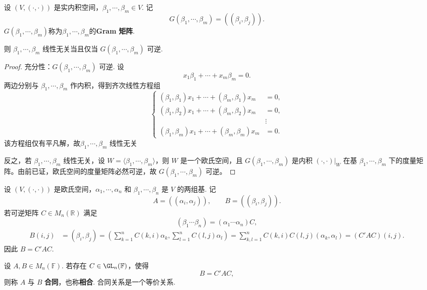 \begin{proposition}
	设 $(V,(\cdot,\cdot))$ 是实内积空间，$\beta_1,\cdots,\beta_m\in V$. 记
	\[
	G(\beta_1,\cdots,\beta_m)=((\beta_i,\beta_j)).
	\]
	\label{p1:concept:c6-l624}$G(\beta_1,\cdots,\beta_m)$称为$\beta_1,\cdots,\beta_m$的\textbf{Gram 矩阵}.
	
	则 $\beta_1,\cdots,\beta_m$ 线性无关当且仅当 $G(\beta_1,\cdots,\beta_m)$ 可逆.
\end{proposition}
\begin{proof}
	充分性：$G(\beta_1,\cdots,\beta_m)$ 可逆. 设
	\[
	x_1\beta_1+\cdots+x_m\beta_m=0.
	\]
	两边分别与 $\beta_1,\cdots,\beta_m$ 作内积，得到齐次线性方程组
	\[
	\left\{
	\begin{aligned}
		(\beta_1,\beta_1)x_1+\cdots+(\beta_m,\beta_1)x_m&=0,\\
		(\beta_1,\beta_2)x_1+\cdots+(\beta_m,\beta_2)x_m&=0,\\
		&\vdots\\
		(\beta_1,\beta_m)x_1+\cdots+(\beta_m,\beta_m)x_m&=0.
	\end{aligned}
	\right.
	\]
	该方程组仅有平凡解，故$\beta_1,\cdots,\beta_m$ 线性无关
	
	反之，若 $\beta_1,\cdots,\beta_m$ 线性无关，设 $W=\langle\beta_1,\cdots,\beta_m\rangle$，则 $W$ 是一个欧氏空间，且 $G(\beta_1,\cdots,\beta_m)$ 是内积 $(\cdot,\cdot)|_W$ 在基 $\beta_1,\cdots,\beta_m$ 下的度量矩阵。由前已证，欧氏空间的度量矩阵必然可逆，故 $G(\beta_1,\cdots,\beta_m)$ 可逆。
\end{proof}

\begin{example}
	设 $(V,(\cdot,\cdot))$ 是欧氏空间，$\alpha_1,\cdots,\alpha_n$ 和 $\beta_1,\cdots,\beta_n$ 是 $V$ 的两组基. 记
	\[
	A=((\alpha_i,\alpha_j)),
	\qquad
	B=((\beta_i,\beta_j)).
	\]
	若可逆矩阵 $C\in M_n(\mathbb{R})$ 满足
	\[
	(\beta_1\cdots\beta_n)=(\alpha_1\cdots\alpha_n)C,
	\]
	\[
	\begin{aligned}
		B(i,j)&=(\beta_i,\beta_j) =\left(\sum_{k=1}^n C(k,i)\alpha_k,\sum_{l=1}^n C(l,j)\alpha_l\right)=\sum_{k,l=1}^n C(k,i)C(l,j)(\alpha_k,\alpha_l)=(C'AC)(i,j).
	\end{aligned}
	\]
	因此 $B=C'AC$.
\end{example}


\begin{definition}\label{p1:concept:c6-l669}
	设 $A,B\in M_n(\mathbb{F})$. 若存在 $C\in \GL_n(\mathbb{F})$，使得
	\[
	B=C'AC,
	\]
	则称 $A$ 与 $B$ \textbf{合同}，也称\textbf{相合}. 合同关系是一个等价关系.
\end{definition}

